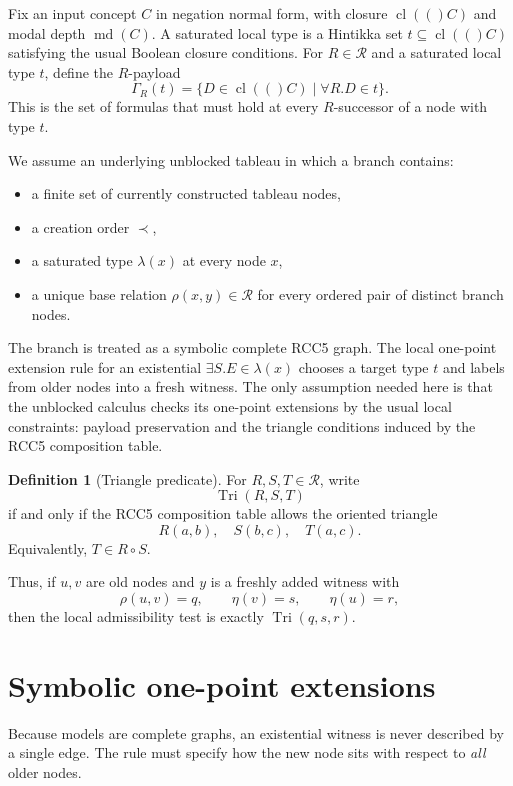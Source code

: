 \documentclass[11pt]{article}
\theoremstyle{definition}
\newtheorem{definition}[theorem]{Definition}
\newcommand{\Roles}{\mathcal{R}}
\newcommand{\cl}[1]{\operatorname{cl}(#1)}
\newcommand{\md}{\operatorname{md}}
\newcommand{\Tri}{\operatorname{Tri}}
\begin{document}
Fix an input concept $C$ in negation normal form, with closure $\cl(C)$ and modal depth $\md(C)$. A saturated local type is a Hintikka set $t\subseteq \cl(C)$ satisfying the usual Boolean closure conditions. For $R\in\Roles$ and a saturated local type $t$, define the $R$-payload
\[
\Gamma_R(t)=\{D\in \cl(C)\mid \forall R.D\in t\}.
\]
This is the set of formulas that must hold at every $R$-successor of a node with type $t$.

We assume an underlying unblocked tableau in which a branch contains:
\begin{itemize}
  \item a finite set of currently constructed tableau nodes,
  \item a creation order $\prec$,
  \item a saturated type $\lambda(x)$ at every node $x$,
  \item a unique base relation $\rho(x,y)\in\Roles$ for every ordered pair of distinct branch nodes.
\end{itemize}

The branch is treated as a symbolic complete RCC5 graph. The local one-point extension rule for an existential $\exists S.E\in \lambda(x)$ chooses a target type $t$ and labels from older nodes into a fresh witness. The only assumption needed here is that the unblocked calculus checks its one-point extensions by the usual local constraints: payload preservation and the triangle conditions induced by the RCC5 composition table.

\begin{definition}[Triangle predicate]
For $R,S,T\in \Roles$, write
\[
\Tri(R,S,T)
\]
if and only if the RCC5 composition table allows the oriented triangle
\[
R(a,b),\quad S(b,c),\quad T(a,c).
\]
Equivalently, $T\in R\circ S$.
\end{definition}

Thus, if $u,v$ are old nodes and $y$ is a freshly added witness with
\[
\rho(u,v)=q,\qquad \eta(v)=s,\qquad \eta(u)=r,
\]
then the local admissibility test is exactly $\Tri(q,s,r)$.

\section{Symbolic one-point extensions}

Because models are complete graphs, an existential witness is never described by a single edge. The rule must specify how the new node sits with respect to \emph{all} older nodes.
\end{document}
